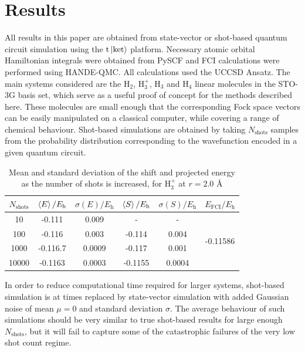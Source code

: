 \documentclass[%
 reprint,
 amsmath,amssymb,
 aps,
]{revtex4-2}
\begin{document}
\section{Results}\label{sec:res}
All results in this paper are obtained from state-vector or shot-based quantum circuit simulation using the $\mathrm{t}\ket{\mathrm{ket}}$ platform.\cite{Sivarajah2021} Necessary atomic orbital Hamiltonian integrals were obtained from PySCF\cite{Sun2020} and FCI calculations were performed using HANDE-QMC.\cite{Spencer2019} All calculations used the UCCSD Ansatz. The main systems considered are the H$_2$, H$_3^+$, H$_3$ and H$_4$ linear molecules in the STO-3G basis set,\cite{Hehre1969} which serve as a useful proof of concept for the methods described here. These molecules are small enough that the corresponding Fock space vectors can be easily manipulated on a classical computer, while covering a range of chemical behaviour. Shot-based simulations are obtained by taking $N_\mathrm{shots}$ samples from the probability distribution corresponding to the wavefunction encoded in a given quantum circuit. 
\begin{table}
    \centering
    \begin{tabular}{c|c|c|c|c|c}
       $N_\mathrm{shots}$  &  $\braket{E}/E_\mathrm{h}$ & $\sigma (E)/E_\mathrm{h}$ & $\braket{S}/E_\mathrm{h}$ & $\sigma(S)/E_\mathrm{h}$&$E_\mathrm{FCI}/E_\mathrm{h}$\\
       \hline
         10 & -0.111 & 0.009 & - & - &\multirow{4}{*}{-0.11586}\\
         100 & -0.116& 0.003& -0.114& 0.004& \\
         1000 & -0.116.7& 0.0009 & -0.117& 0.001& \\
         10000 & -0.1163 & 0.0003& -0.1155 & 0.0004& \\
         \hline
    \end{tabular}
    \caption{\small \justifying Mean and standard deviation of the shift and projected energy as the number of shots is increased, for H$_3^+$ at $r = 2.0$ \r{A}}
    \label{tab:variance}
\end{table}
In order to reduce computational time required for larger systems, shot-based simulation is at times replaced by state-vector simulation with added Gaussian noise of mean $\mu = 0$ and standard deviation $\sigma$. The average behaviour of such simulations should be very similar to true shot-based results for large enough $N_\mathrm{shots}$, but it will fail to capture some of the catastrophic failures of the very low shot count regime.
\end{document}
